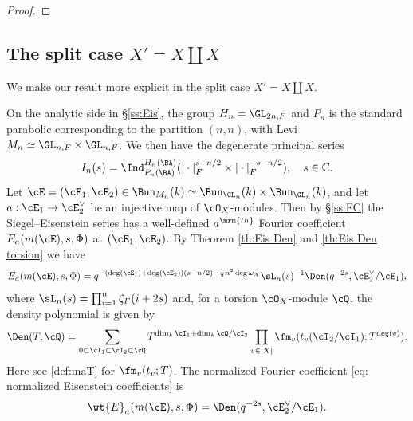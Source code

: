 \begin{proof}
%

\end{proof}


\subsection{The split case $X'=X\coprod X$}
We make our result more explicit in the split case $X'=X\coprod X$.

  On the analytic side in \S\ref{ss:Eis}, the group $H_n=\GL_{2n,F}$ and $P_n$ is the standard parabolic corresponding to the partition $(n,n)$, with Levi $M_n\simeq \GL_{n,F}\times \GL_{n,F}$. We then have the degenerate principal series
  $$
I_n(s)=\Ind_{P_n(\BA)}^{H_n(\BA)}( |\cdot|_{F}^{s+n/2}\times |\cdot|_{F}^{-s-n/2}),\quad s\in \mathbb{C}.
$$
Let $\cE=(\cE_1,\cE_2)\in \Bun_{M_n}(k)\simeq\Bun_{\GL_n}(k)\times \Bun_{\GL_n}(k)$, and let $a:\cE_1\to\cE_2^\vee$ be an injective map of $\cO_X$-modules. Then by \S\ref{ss:FC} the Siegel--Eisenstein series has a well-defined $a^{\mrm{th}}$ Fourier coefficient $E_{a}(m(\cE),s,\Phi)$ at $(\cE_1,\cE_2)$. By Theorem \ref{th:Eis Den}  and \ref{th:Eis Den torsion} we have
  \begin{eqnarray*}
E_{a}(m(\cE),s,\Phi)=q^{-(\deg(\cE_1)+\deg(\cE_2))( s-n/2)-\frac{1}{2}n^2\deg\omega_X }\sL_n(s) ^{-1} \Den(q^{-2s},  \cE_2^\vee/\cE_1),
\end{eqnarray*}
where $\sL_n(s)=\prod_{i=1}^n\zeta_F(i+2s)$ and, for a torsion $\cO_X$-module $\cQ$, the density polynomial is given by
$$
 \Den(T,  \cQ)=\sum_{0 \subset \cI_1 \subset \cI_2\subset \cQ} T^{\dim_{k}\cI_1+\dim_k \cQ/\cI_2}\prod_{v\in |X|}\fm_{v}(t_v(\cI_2/\cI_1);T^{\deg(v)}).
$$
Here see \eqref{def:maT} for $\fm_{v}(t_v;T)$.
The normalized Fourier coefficient \eqref{eq: normalized Eisenstein coefficients} is
\[
\wt{E}_{a}(m(\cE),s,\Phi)  =  \Den(q^{-2s},  \cE_2^\vee/\cE_1).
\]

